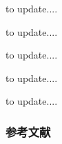 \begin{frame}

to update....

\end{frame}


\begin{frame}

to update....

\end{frame}


\begin{frame}

to update....

\end{frame}


\begin{frame}

to update....

\end{frame}


\begin{frame}

to update....

\end{frame}


\begin{frame}[allowframebreaks]
\frametitle{参考文献}

{\footnotesize


}

\end{frame}


